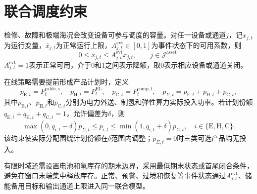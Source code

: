 \section{联合调度约束}
\label{sec:constraints}

检修、故障和极端海况会改变设备可参与调度的容量。对任一设备或通道$j$，记$x_{j,t}$为运行变量，$\bar x_{j,t}$为正常运行上限，$A_{j,t}^{\mathrm{evt}}\in[0,1]$为事件状态下的可用系数，则
\begin{equation}
0\le x_{j,t}\le A_{j,t}^{\mathrm{evt}}\bar x_{j,t},
\qquad j\in\mathcal J^{\mathrm{asset}}.
\label{eq:availability-general}
\end{equation}
$A_{j,t}^{\mathrm{evt}}=1$表示正常可用，介于0和1之间表示降额，取0表示相应设备或通道关闭。

在线策略需要提前形成产品计划时，定义
\begin{equation}
p_{\mathrm E,t}=P_t^{\mathrm{cable,s}},\quad
p_{\mathrm H,t}=P_t^{\mathrm{EL}},\quad
p_{\mathrm C,t}=P_t^{\mathrm{comp,f}},\quad
p_{\Sigma,t}=p_{\mathrm E,t}+p_{\mathrm H,t}+p_{\mathrm C,t},
\label{eq:hourly-mix-def}
\end{equation}
其中$p_{\mathrm E,t}$、$p_{\mathrm H,t}$和$p_{\mathrm C,t}$分别为电力外送、制氢和弹性算力实际投入功率。若计划份额$q_{\mathrm E,t}+q_{\mathrm H,t}+q_{\mathrm C,t}=1$，允许偏差为$\delta$，则
\begin{equation}
\max(0,q_{i,t}-\delta)p_{\Sigma,t}
\le p_{i,t}
\le
\min(1,q_{i,t}+\delta)p_{\Sigma,t},
\quad i\in\{\mathrm E,\mathrm H,\mathrm C\}.
\label{eq:hourly-mix}
\end{equation}
该约束使实际分配围绕计划份额在$\delta$范围内调整；$p_{\Sigma,t}=0$时三类可选产品均无投入。

有限时域还需设置电池和氢库存的期末边界，采用最低期末状态或首尾闭合条件，避免在窗口末端集中释放库存。正常、预警、过境和恢复等事件状态通过$A_{j,t}^{\mathrm{evt}}$、储能备用目标和输出通道上限进入同一联合模型。
